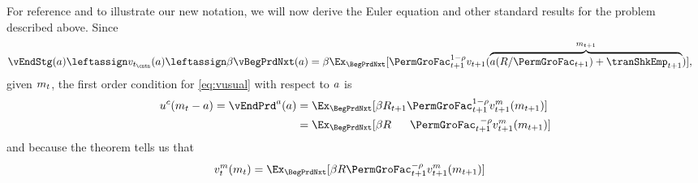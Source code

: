 For reference and to illustrate our new notation, we will now derive the Euler equation and other standard results for the problem described above.
Since
\begin{equation}\begin{gathered}\begin{aligned}
  \vEndStg(\aNrm) & \leftassign \vFunc_{\prd_\cntn}(\aNrm) \leftassign \DiscFac \vBegPrdNxt(\aNrm) = \DiscFac \Ex_{\BegPrdNxt}[\PermGroFac_{\prd+1}^{1-\CRRA}\vFunc_{\prd+1}(\overbrace{a (\Rfree / \PermGroFac_{\prd+1})+\tranShkEmp_{\prd+1}}^{\mNrm_{\prd+1}})],
\end{aligned}\end{gathered}\end{equation}
given $m_{t}$, the first order condition for \eqref{eq:vusual} with respect to $a$ is
\begin{equation}\begin{gathered}\begin{aligned}
      \uFunc^{\cNrm}(\mNrm_{\prd}-\aNrm) = \vEndPrd^{\aNrm}(a) & = \Ex_{\BegPrdNxt}[\DiscFac \RNrm_{\prd+1}\PermGroFac_{\prd+1}^{1-\CRRA}{\vFunc}^\mNrm_{\prd+1}(\mNrm_{\prd+1})]  \label{eq:upceqEvtp1}
      \\                        & =  \Ex_{\BegPrdNxt}[\DiscFac\Rfree\phantom{._{\prd+1}}\PermGroFac_{\prd+1}^{\phantom{1}-\CRRA}{\vFunc}^{\mNrm}_{\prd+1}(\mNrm_{\prd+1})]
    \end{aligned}\end{gathered}\end{equation}
and because the  theorem tells us that
\begin{equation}\begin{gathered}\begin{aligned}
      {\vFunc}^{\mNrm}_{\prd}(\mNrm_{\prd})  & =  \Ex_{\BegPrdNxt} [\DiscFac \Rfree \PermGroFac_{\prd+1}^{-\CRRA}{\vFunc}^{\mNrm}_{\prd+1}(\mNrm_{\prd+1})] \label{eq:envelope}
    \end{aligned}\end{gathered}\end{equation}
